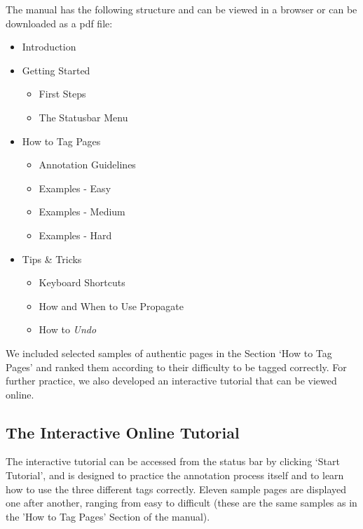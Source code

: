 \documentclass[12pt]{article}
\begin{document}
The manual has the following structure and can be viewed in a browser or can be downloaded as a pdf file\footnotemark[\value{footnote}]:


\begin{itemize}
	\item Introduction
	\item Getting Started
		\begin{itemize}
			\item First Steps
			\item The Statusbar Menu
		\end{itemize}
	\item How to Tag Pages
		\begin{itemize}
			\item Annotation Guidelines
			\item Examples - Easy
			\item Examples - Medium
			\item Examples - Hard
		\end{itemize}
	\item Tips \& Tricks
		\begin{itemize}
			\item Keyboard Shortcuts
			\item How and When to Use Propagate
			\item How to \textit{Undo}
		\end{itemize}
	
\end{itemize}

We included selected samples of authentic pages in the Section `How to Tag Pages' and ranked them according to their difficulty to be tagged correctly. 
For further practice, we also developed an interactive tutorial that can be viewed online.


\subsection{The Interactive Online Tutorial}

The interactive tutorial can be accessed from the status bar by clicking `Start Tutorial', and is designed to practice the annotation process itself and to learn how to use the three different tags correctly. 
Eleven sample pages are displayed one after another, ranging from easy to difficult (these are the same samples as in the 'How to Tag Pages' Section of the manual).
\end{document}
